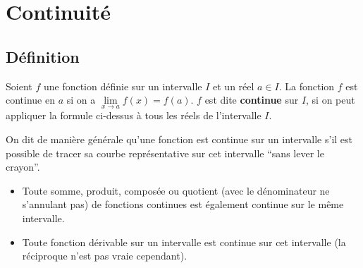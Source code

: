 






	\section{Continuité}

	\subsection{Définition}

	\begin{formula}[Définition]
		Soient $f$ une fonction définie sur un intervalle $I$ et un réel $a \in I$. La fonction $f$ est continue en $a$ si on a $\lim\limits_{x \rightarrow a} f(x) = f(a)$.
		\newpar
		$f$ est dite \textbf{continue} sur $I$, si on peut appliquer la formule ci-dessus à tous les réels de l'intervalle $I$.
	\end{formula}

	On dit de manière générale qu'une fonction est continue sur un intervalle s'il est possible de tracer sa courbe représentative sur cet intervalle ``sans lever le crayon''.

	\begin{formula}
		\entretitreetliste
		\begin{itemize}
			\item Toute somme, produit, composée ou quotient (avec le dénominateur ne s'annulant pas) de fonctions continues est également continue sur le même intervalle.
			\item Toute fonction dérivable sur un intervalle est continue sur cet intervalle (la réciproque n'est pas vraie cependant).
		\end{itemize}
	\end{formula}

